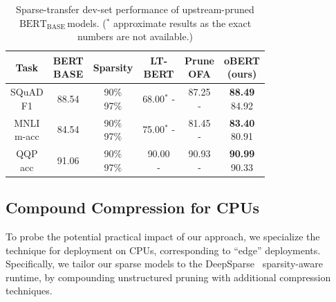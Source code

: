 \documentclass[11pt]{article}
\newcommand{\bert}{$\textrm{BERT}_{\textrm{BASE}}\,$}
\begin{document}
\begin{table}[tb!]
\setlength{\tabcolsep}{5.5pt}
    \caption{Sparse-transfer dev-set performance of upstream-pruned \bert models. ($^*$ approximate results as the exact numbers are not available.)}
    \label{tab:sparse-transfer}
    \centering
    {\small 
    \begin{tabular}{ccc|ccc}
    \toprule 
    Task & \makecell{BERT\\{\scriptsize BASE}} & Sparsity & \makecell{LT-\\BERT} & \makecell{Prune\\OFA} & \makecell{oBERT\\(ours)} \\
    \midrule
    \makecell{SQuAD \\ F1} & 88.54 & \makecell{90\% \\ 97\%} & \makecell{68.00$^*$\\-} & \makecell{87.25\\ -} & \makecell{\textbf{88.49}\\ 84.92} \\
    \midrule
    \makecell{MNLI \\ m-acc} & 84.54 & \makecell{90\% \\ 97\%}  & \makecell{75.00$^*$\\-} & \makecell{81.45\\ -} & \makecell{\textbf{83.40} \\ 80.91} \\
    \midrule
    \makecell{QQP \\ acc} & 91.06 &  \makecell{90\% \\ 97\%} & \makecell{90.00\\-} & \makecell{90.93 \\ -} & \makecell{\textbf{90.99} \\ 90.33} \\
    \bottomrule
    \end{tabular}
    }
    \vspace{-1.2em}
\end{table}

\subsection{Compound Compression for CPUs}
\label{sec:compound}

To probe the potential practical impact of our approach, we specialize the technique for deployment on CPUs, corresponding to ``edge'' deployments. Specifically, we tailor our sparse models to the DeepSparse~\cite{deepsparse} sparsity-aware runtime, by compounding unstructured pruning with additional compression techniques.  
\end{document}
